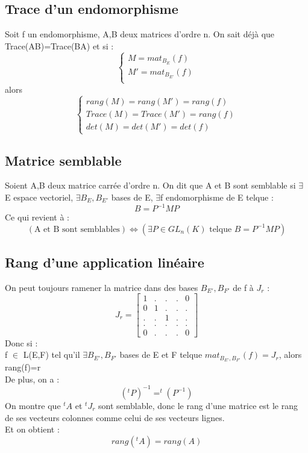 \subsection{Trace d'un endomorphisme}
Soit f un endomorphisme, A,B deux matrices d'ordre n. On sait déjà que Trace(AB)=Trace(BA) et si :
\[\left\{
  \begin{array}{ll}
    M = mat_{B_E}(f)\\
    M' = mat_{B_{E'}}(f) \\
  \end{array}\right.\]
alors \[\left\{
  \begin{array}{ll}
   rang(M)=rang(M')=rang(f)\\
   Trace(M)=Trace(M')=rang(f) \\
   det(M)=det(M')=det(f)
  \end{array}\right.\]
\subsection{Matrice semblable}
\begin{de}
 Soient A,B deux matrice carrée d'ordre n. On dit que A et B sont semblable si $\exists$E espace vectoriel, $\exists B_E,B_{E'}$ bases de E, $\exists$f endomorphisme de E telque : 
$$B = P^{-1}MP$$
Ce qui revient à : 
$$(\mbox{A et B sont semblables}) \Leftrightarrow (\exists P  \in GL_n(K) \mbox{ telque } B = P^{-1}MP) $$
\end{de}
\subsection{Rang d'une application linéaire}
On peut toujours ramener la matrice dans des bases $B_{E'},B_{F'}$ de f à $J_r$ : 
$$J_r = \begin{bmatrix}
1 & . & . & . & 0\\
0 & 1 & . & . & .\\
. & . & 1 & . & . \\
. & . & . & . & . \\
0 & . & . & . & 0
\end{bmatrix}$$
Donc si : \\
f $\in$ L(E,F) tel qu'il $\exists B_{E'},B_{F'}$ bases de E et F telque $mat_{B_{E'},B_{F'}}(f)=J_r$, alors rang(f)=r\\
De plus, on a :
$$(^tP)^{-1}=^t(P^{-1})$$
On montre que $^tA$ et $^tJ_r$ sont semblable, donc le rang d'une matrice est le rang de ses vecteurs colonnes comme celui de ses vecteurs lignes.\\
Et on obtient : 
$$rang(^tA) = rang(A)$$
